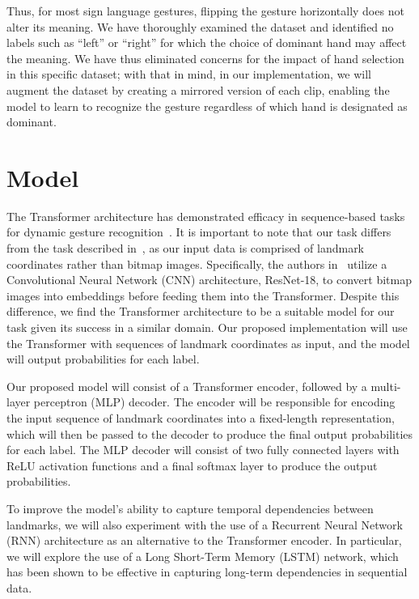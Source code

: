 \documentclass[10pt,twocolumn,letterpaper]{article}
\begin{document}
\begin{CJK*}{UTF8}{bsmi}
{Thus, for most sign language gestures, flipping the gesture horizontally does not alter its meaning. We have thoroughly examined the dataset and identified no labels such as “left” or “right” for which the choice of dominant hand may affect the meaning. We have thus eliminated concerns for the impact of hand selection in this specific dataset; with that in mind, in our implementation, we will augment the dataset by creating a mirrored version of each clip, enabling the model to learn to recognize the gesture regardless of which hand is designated as dominant.
}

\section{Model}
{\color{blue}
The Transformer architecture has demonstrated efficacy in sequence-based tasks for dynamic gesture recognition~\cite{TR}. It is important to note that our task differs from the task described in~\cite{TR}, as our input data is comprised of landmark coordinates rather than bitmap images. Specifically, the authors in~\cite{TR} utilize a Convolutional Neural Network (CNN) architecture, ResNet-18, to convert bitmap images into embeddings before feeding them into the Transformer. Despite this difference, we find the Transformer architecture to be a suitable model for our task given its success in a similar domain. Our proposed implementation will use the Transformer with sequences of landmark coordinates as input, and the model will output probabilities for each label.

Our proposed model will consist of a Transformer encoder, followed by a multi-layer perceptron (MLP) decoder. The encoder will be responsible for encoding the input sequence of landmark coordinates into a fixed-length representation, which will then be passed to the decoder to produce the final output probabilities for each label. The MLP decoder will consist of two fully connected layers with ReLU activation functions and a final softmax layer to produce the output probabilities.

To improve the model’s ability to capture temporal dependencies between landmarks, we will also experiment with the use of a Recurrent Neural Network (RNN) architecture as an alternative to the Transformer encoder. In particular, we will explore the use of a Long Short-Term Memory (LSTM) network, which has been shown to be effective in capturing long-term dependencies in sequential data.
}


\end{CJK*}
\end{document}

